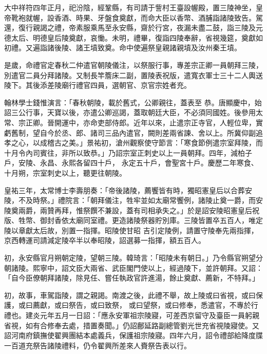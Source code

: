 \begin{pinyinscope}
 大中祥符四年正月，祀汾陰，經鞏縣，有司請于訾村王臺設幄殿，置三陵神坐，皇帝靴袍就幄，設香酒、時果、牙盤食奠獻，而命大臣以香幣、酒脯詣諸陵致告。駕還，復行親謁之禮，帝素服乘馬至永安縣，齋於行宮，夜漏未盡二鼓，詣三陵及元
 德太后、明德皇后陵奠獻，哀慟。未明，禮畢，復詣四陵奉辭，省視幾筵，奠獻如初禮。又遍詣諸後陵、諸王墳致奠。命中使遍祭皇親諸親墳及汝州秦王墳。



 是歲，命禮官定春秋二仲遣官朝陵儀注，以祭服行事，專差宗正卿一員朝拜三陵，別遣官二員分拜諸陵。又制長竿簷床二副，置陵表祝版，遣寬衣軍士三十二人輿送陵下。其後添差陵廟行禮官四員，選朝官、京官宗姓者充。



 翰林學士錢惟演言：「春秋朝陵，載於舊式，公卿親往，蓋表至
 恭。唐顯慶中，始詔三公行事，天寶以後，亦遣公卿巡謁，蓋取朝廷大臣，不必須同國姓。後參用太常、宗正卿。晉開運中，亦命吏部侍郎。近年以來，止遣宗正寺官，人輕位卑，實虧舊制，望自今於丞、郎、諸司三品內遣官，闕則差兩省諫、舍以上。所冀仰副追孝之心，以成稽古之美。」景祐初，滄州觀察使守節言：「寒食節例遣宗室拜陵，而十月令內司賓往，非所以致恭。」乃詔宗室正刺史以上一員朝拜。四年，減柏子戶，安陵、永昌、永熙各留四十戶，
 永定五十戶，會聖宮十戶。慶歷二年寒食、十月朔，宗室刺史以上，聽更往朝陵。



 皇祐三年，太常博士李壽朋奏：「帝後諸陵，薦饗皆有時，獨昭憲皇后以合葬安陵，不及時祭。」禮院言：「朝拜儀注，牲牢並如太廟常饗例，諸陵止奠一爵，而安陵奠兩爵，兩贊再拜，惟祭饌不兼設，蓋有司相承失之。」於是詔安陵昭憲皇后祝版、牲幣、御封香依太廟同室禮。更造諸陵祭器貯別庫。三陵皆置卒五百人，唯定陵以章獻太后故，別置一指揮。昭陵使甘昭
 吉引定陵例，請置守陵奉先兩指揮，京西轉運司請減定陵卒半以奉昭陵，詔選募一指揮，額五百人。



 初，永安縣官月朔朝定陵，望朝三陵。韓琦言：「昭陵未有朝日。」乃令縣官朔望分朝諸陵。熙寧中，詔文臣大兩省、武臣閣門使以上，經過陵下，並許朝拜。又詔：「自今臣僚朝拜諸陵，除見任、嘗任執政官許進湯，餘止奠獻、薦新，不特拜。」



 初，故事，車駕詣陵，謂之親謁。南渡之後，此禮不舉，故上陵或曰省視，或曰保護，或曰薦獻，或曰祭告，或曰致祭，
 或曰望祭，或曰修奉，悉遣官，不專於行禮也。建炎元年五月一日詔：「應永安軍祖宗陵寢，可差西京留守及臺臣一員躬親省視，如有合修奉去處，措置奏聞。」仍詔鄜延路副總管劉光世充省視陵寢使。又詔河南府鎮撫使翟興團結本處義兵，保護祖宗陵寢。四年六月，詔令禮部給降度牒一百道充祭告諸陵禮料，仍令翟興所差來人賚祭告表以行。




\end{pinyinscope}
